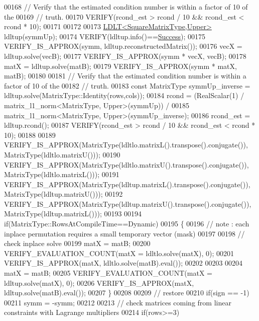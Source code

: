 \begin{DoxyCode}
00168     \textcolor{comment}{// Verify that the estimated condition number is within a factor of 10 of the}
00169     \textcolor{comment}{// truth.}
00170     VERIFY(rcond\_est > rcond / 10 && rcond\_est < rcond * 10);
00171 
00172 
00173     \hyperlink{group___cholesky___module_class_eigen_1_1_l_d_l_t}{LDLT<SquareMatrixType,Upper>} ldltup(symmUp);
00174     VERIFY(ldltup.info()==\hyperlink{group__enums_gga85fad7b87587764e5cf6b513a9e0ee5ea52581b035f4b59c203b8ff999ef5fcea}{Success});
00175     VERIFY\_IS\_APPROX(symm, ldltup.reconstructedMatrix());
00176     vecX = ldltup.solve(vecB);
00177     VERIFY\_IS\_APPROX(symm * vecX, vecB);
00178     matX = ldltup.solve(matB);
00179     VERIFY\_IS\_APPROX(symm * matX, matB);
00180 
00181     \textcolor{comment}{// Verify that the estimated condition number is within a factor of 10 of the}
00182     \textcolor{comment}{// truth.}
00183     \textcolor{keyword}{const} MatrixType symmUp\_inverse = ldltup.solve(MatrixType::Identity(rows,cols));
00184     rcond = (RealScalar(1) / matrix\_l1\_norm<MatrixType, Upper>(symmUp)) /
00185                              matrix\_l1\_norm<MatrixType, Upper>(symmUp\_inverse);
00186     rcond\_est = ldltup.rcond();
00187     VERIFY(rcond\_est > rcond / 10 && rcond\_est < rcond * 10);
00188 
00189     VERIFY\_IS\_APPROX(MatrixType(ldltlo.matrixL().transpose().conjugate()), MatrixType(ldltlo.matrixU()));
00190     VERIFY\_IS\_APPROX(MatrixType(ldltlo.matrixU().transpose().conjugate()), MatrixType(ldltlo.matrixL()));
00191     VERIFY\_IS\_APPROX(MatrixType(ldltup.matrixL().transpose().conjugate()), MatrixType(ldltup.matrixU()));
00192     VERIFY\_IS\_APPROX(MatrixType(ldltup.matrixU().transpose().conjugate()), MatrixType(ldltup.matrixL()));
00193 
00194     \textcolor{keywordflow}{if}(MatrixType::RowsAtCompileTime==Dynamic)
00195     \{
00196       \textcolor{comment}{// note : each inplace permutation requires a small temporary vector (mask)}
00197 
00198       \textcolor{comment}{// check inplace solve}
00199       matX = matB;
00200       VERIFY\_EVALUATION\_COUNT(matX = ldltlo.solve(matX), 0);
00201       VERIFY\_IS\_APPROX(matX, ldltlo.solve(matB).eval());
00202 
00203 
00204       matX = matB;
00205       VERIFY\_EVALUATION\_COUNT(matX = ldltup.solve(matX), 0);
00206       VERIFY\_IS\_APPROX(matX, ldltup.solve(matB).eval());
00207     \}
00208 
00209     \textcolor{comment}{// restore}
00210     \textcolor{keywordflow}{if}(sign == -1)
00211       symm = -symm;
00212 
00213     \textcolor{comment}{// check matrices coming from linear constraints with Lagrange multipliers}
00214     \textcolor{keywordflow}{if}(rows>=3)

\end{DoxyCode}
